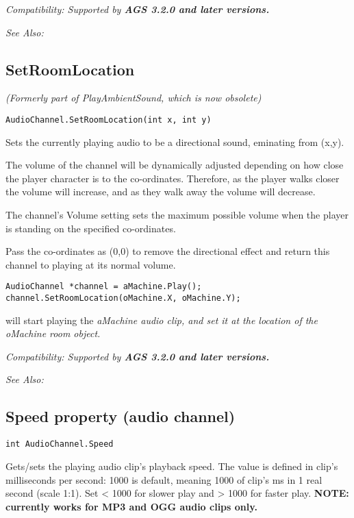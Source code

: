 \it{Compatibility:} Supported by \bf{AGS 3.2.0} and later versions.

\it{See Also:} 


\subsection{SetRoomLocation}\label{AudioChannel.SetRoomLocation}%

\it{(Formerly part of PlayAmbientSound, which is now obsolete)}

\begin{verbatim}
AudioChannel.SetRoomLocation(int x, int y)
\end{verbatim}
Sets the currently playing audio to be a directional sound, eminating from (x,y).

The volume of the channel will be dynamically adjusted depending on how close the player
character is to the co-ordinates. Therefore, as the player walks closer the volume will
increase, and as they walk away the volume will decrease.

The channel's Volume setting sets the maximum possible volume when the player is standing
on the specified co-ordinates.

Pass the co-ordinates as (0,0) to remove the directional effect and return this channel
to playing at its normal volume.

\begin{verbatim}
AudioChannel *channel = aMachine.Play();
channel.SetRoomLocation(oMachine.X, oMachine.Y);
\end{verbatim}
will start playing the \it{aMachine} audio clip, and set it at the location of the \it{oMachine}
room object.

\it{Compatibility:} Supported by \bf{AGS 3.2.0} and later versions.

\it{See Also:} 


\subsection{Speed property (audio channel)}\label{AudioChannel.Speed}%

\begin{verbatim}
int AudioChannel.Speed
\end{verbatim}
Gets/sets the playing audio clip's playback speed. The value is defined in clip's milliseconds per second:
1000 is default, meaning 1000 of clip's ms in 1 real second (scale 1:1). Set < 1000 for slower play and > 1000
for faster play.
\bf{NOTE:} currently works for MP3 and OGG audio clips only.

